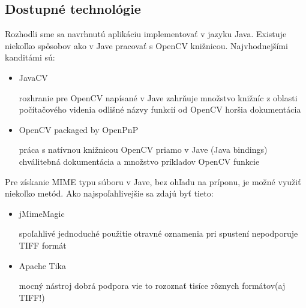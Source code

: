 \subsection{Dostupné technológie}
Rozhodli sme sa navrhnutú aplikáciu implementovať v jazyku Java. Existuje niekoľko spôsobov ako v Jave pracovať s OpenCV knižnicou. Najvhodnejšími kanditámi sú:
\begin{itemize}
	\item JavaCV
		\begin{itemize}
			\pro rozhranie pre OpenCV napísané v Jave
			\pro zahrňuje množstvo knižníc z oblasti počítačového videnia
			\con odlišné názvy funkcií od OpenCV
			\con horšia dokumentácia
		\end{itemize}
	\item OpenCV packaged by OpenPnP
		\begin{itemize}
			\pro práca s natívnou knižnicou OpenCV priamo v Jave (Java bindings)
			\pro chválitebná dokumentácia a množstvo príkladov
			\con {} OpenCV funkcie
		\end{itemize}
\end{itemize}

Pre získanie MIME typu súboru v Jave, bez ohľadu na príponu, je možné využiť niekoľko metód. Ako najspoľahlivejšie sa zdajú byť tieto:
\begin{itemize}
	\item jMimeMagic
	\begin{itemize}
		\pro spoľahlivé
		\pro jednoduché použitie
		\con otravné  oznamenia pri spustení
		\con nepodporuje TIFF formát
	\end{itemize}
	\item Apache Tika
	\begin{itemize}
		\pro mocný nástroj
		\pro dobrá podpora
		\pro vie to rozoznať tisíce rôznych formátov(aj TIFF!)
	\end{itemize}
\end{itemize}

